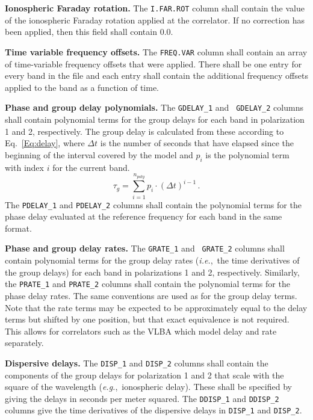 \documentclass[twoside]{article}
\newcommand{\Hi}[1]{\textcolor{hicol}{#1}}
\newcommand{\Me}[1]{\textcolor{mecol}{#1}}
\newcommand{\eg}{{\it e.g.},}
\newcommand{\ie}{{\it i.e.},}
\begin{document}
{\bf Ionospheric Faraday rotation.}  The {\tt I.FAR.ROT} column shall
contain the value of the ionospheric Faraday rotation applied at the
correlator.  If no correction has been applied, then this field shall
contain 0.0.

{\bf Time variable frequency offsets.} The {\tt FREQ.VAR} column shall
contain an array of time-variable frequency offsets that were applied.
\Hi{There shall be one entry for every band in the file and each entry
shall contain the additional frequency offsets applied to the band as
a function of time.}

{\bf Phase and group delay polynomials.}  The {\tt GDELAY\_1} and {\tt
  GDELAY\_2} columns shall contain polynomial terms for the group
delays for each band in polarization 1 and 2\Hi{, respectively}.  The
group delay is calculated from these according to Eq.~\ref{Eq:delay},
where $\Delta t$ is the number of seconds that have elapsed since the
beginning of the interval covered by the model and $p_i$ is the
polynomial term with index $i$ for the current band.
\begin{equation}
\tau_g = \sum_{i=1}^{n_{poly}} p_i \cdot \left( \Delta t \right) ^{i-1}
  \label{Eq:delay} \, .
\end{equation}
The {\tt PDELAY\_1} and {\tt PDELAY\_2} columns shall contain the
polynomial terms for the phase delay evaluated at the reference
frequency for each band in the same format.

{\bf Phase and group delay rates.}  The {\tt GRATE\_1} and {\tt
GRATE\_2} columns shall contain polynomial terms for the group delay
rates (\ie\ the time derivatives of the group delays) for each band in
polarizations 1 and 2, respectively.  Similarly, the {\tt PRATE\_1}
and {\tt PRATE\_2} columns shall contain the polynomial terms for the
phase delay rates.  The same conventions are used as for the group
delay terms.  Note that the rate terms may be expected to be
approximately equal to the delay terms but shifted by one position,
but that exact equivalence is not required.  This allows for
correlators such as the VLBA which model delay and rate separately.

{\bf Dispersive delays.}  The {\tt DISP\_1} and {\tt DISP\_2} columns
shall contain the components of the group delays for polarization 1
and 2 that scale with the square of the wavelength (\eg\ ionospheric
delay).  These shall be specified by giving the delays \Me{in seconds
per meter squared}.  The {\tt DDISP\_1} and {\tt DDISP\_2} columns
give the time derivatives of the dispersive delays in {\tt DISP\_1}
and {\tt DISP\_2}\@.
\end{document}
